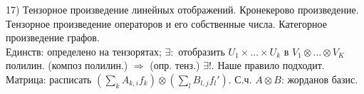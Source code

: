 17) Тензорное произведение линейных отображений. Кронекерово произведение. Тензорное произведение операторов и его собственные числа. Категорное произведение графов.\\

Единств: определено на тензорятах; $\exists:$ отобразить $U_1\times\dots\times U_k$ в $V_1\otimes\dots\otimes V_K$ полилин. (композ полилин.) $\Rightarrow$ (опр. тенз.) $\exists!$. Наше правило подходит. Матрица: расписать $(\sum\limits_{k} A_{k, i} f_k)\otimes(\sum\limits_{l} B_{l, j} f_l')$. С.ч. $A\otimes B$: жорданов базис.\\
